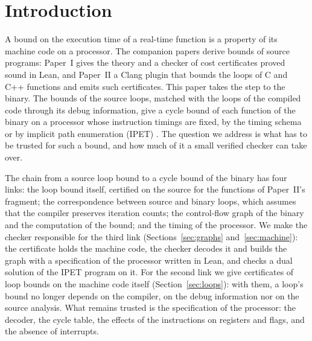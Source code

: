 \documentclass[oneside,english]{amsart}
\numberwithin{equation}{section}
\theoremstyle{plain}
\theoremstyle{definition}
\theoremstyle{plain}
\theoremstyle{plain}
\theoremstyle{remark}
\begin{document}
\maketitle

\section{Introduction}
\label{sec:intro}

A bound on the execution time of a real-time function is a property of its machine code on a processor. The companion papers derive bounds of source programs: Paper~I \cite{crosscheckTheory} gives the theory and a checker of cost certificates proved sound in Lean, and Paper~II \cite{crosscheckTool} a Clang plugin that bounds the loops of C and C++ functions and emits such certificates. This paper takes the step to the binary. The bounds of the source loops, matched with the loops of the compiled code through its debug information, give a cycle bound of each function of the binary on a processor whose instruction timings are fixed, by the timing schema or by implicit path enumeration (IPET) \cite{li1995ilp}. The question we address is what has to be trusted for such a bound, and how much of it a small verified checker can take over.

The chain from a source loop bound to a cycle bound of the binary has four links: the loop bound itself, certified on the source for the functions of Paper~II's fragment; the correspondence between source and binary loops, which assumes that the compiler preserves iteration counts; the control-flow graph of the binary and the computation of the bound; and the timing of the processor. We make the checker responsible for the third link (Sections~\ref{sec:graphs} and~\ref{sec:machine}): the certificate holds the machine code, the checker decodes it and builds the graph with a specification of the processor written in Lean, and checks a dual solution of the IPET program on it. For the second link we give certificates of loop bounds on the machine code itself (Section~\ref{sec:loops}): with them, a loop's bound no longer depends on the compiler, on the debug information nor on the source analysis. What remains trusted is the specification of the processor: the decoder, the cycle table, the effects of the instructions on registers and flags, and the absence of interrupts.
\end{document}
